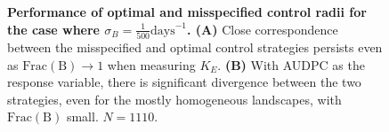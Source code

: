 \documentclass[11pt,letterpaper]{article}
\begin{document}
{\begin{figure}[h]
	\centering

\caption{\label{compare_strategies_delta_sigma} \textbf{Performance of optimal and misspecified control radii for the  case where $\sigma_{B} = \frac{1}{500} \mathrm{days}^{-1}$. (A)} Close correspondence between the misspecified and optimal control strategies persists even as $\mathrm{Frac(B)} \rightarrow 1$ when measuring $K_{E}$.  \textbf{(B)} With AUDPC as the response variable, there is significant divergence between the two strategies, even for the mostly homogeneous landscapes, with $\mathrm{Frac(B)}$ small. $N = 1110$.}
\end{figure}




%





}
\end{document}
